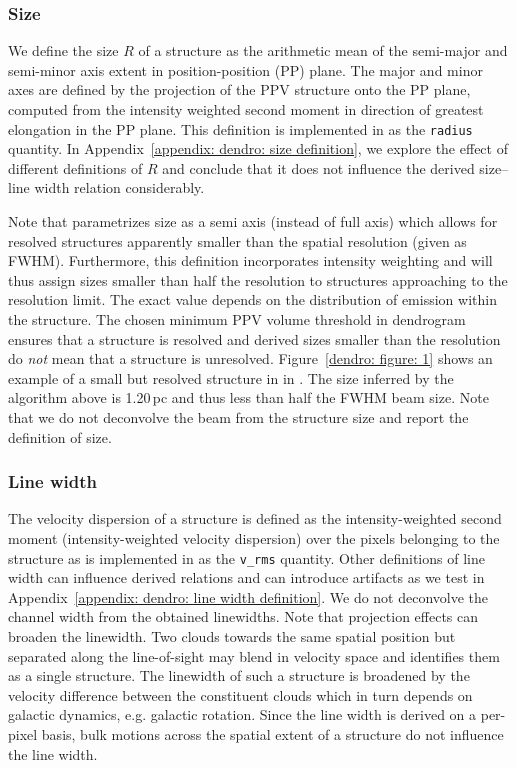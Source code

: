 \subsubsection{Size}
\label{dendro: section: dendrogram size}

We define the size $R$ of a structure as the arithmetic mean of the semi-major and semi-minor axis extent in position-position (PP) plane. The major and minor axes are defined by the projection of the PPV structure onto the PP plane, computed from the intensity weighted second moment in direction of greatest elongation in the PP plane. This definition is implemented in \astrodendro as the \texttt{radius} quantity.
In Appendix~\ref{appendix: dendro: size definition}, we explore the effect of different definitions of $R$ and conclude that it does not influence the derived size--line width relation considerably.

Note that \astrodendro parametrizes size as a semi axis (instead of full axis) which allows for resolved structures apparently smaller than the spatial resolution (given as FWHM). Furthermore, this definition incorporates intensity weighting and will thus assign sizes smaller than half the resolution to structures approaching to the resolution limit. The exact value depends on the distribution of emission within the structure. The chosen minimum PPV volume threshold in dendrogram ensures that a structure is resolved and derived sizes smaller than the resolution do \emph{not} mean that a structure is unresolved.
Figure~\ref{dendro: figure: 1} shows an example of a small but resolved structure in  in . The size inferred by the algorithm above is 1.20\,pc and thus less than half the FWHM beam size.
Note that we do not deconvolve the beam from the structure size and report the \astrodendro definition of size.


\subsubsection{Line width}
\label{dendro: section: dendrogram line width}

The velocity dispersion of a structure is defined as the intensity-weighted second moment (intensity-weighted velocity dispersion) over the pixels belonging to the structure as is implemented in \astrodendro as the \texttt{v\_rms} quantity.
Other definitions of line width can influence derived relations and can introduce artifacts as we test in Appendix~\ref{appendix: dendro: line width definition}.
We do not deconvolve the channel width from the obtained linewidths.
Note that projection effects can broaden the linewidth. Two clouds towards the same spatial position but separated along the line-of-sight may blend in velocity space and \astrodendro identifies them as a single structure. The linewidth of such a structure is broadened by the velocity difference between the constituent clouds which in turn depends on galactic dynamics, e.g. galactic rotation. 
Since the line width is derived on a per-pixel basis, bulk motions across the spatial extent of a structure do not influence the line width.


